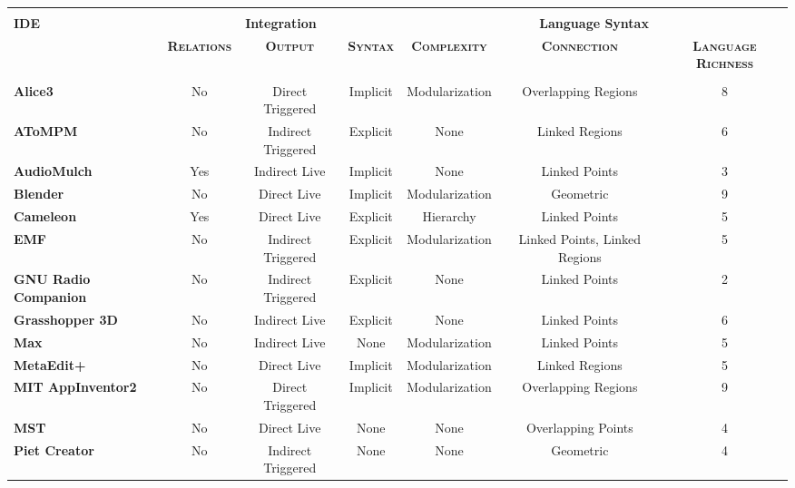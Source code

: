 \begin{table*}
	\centering
		{\scriptsize
		\begin{tabular}{l|ccc|ccc}
		  \hline\hline
		  &&&&&&		\\[-1.5ex]
      \multirow{2}{*}{\textbf{IDE}}
      & \multicolumn{3}{c|}{\textbf{Integration}}
      & \multicolumn{3}{c}{\textbf{Language Syntax}}  \\[1ex]
      & \textbf{\scshape Relations}
      & \textbf{\scshape Output}
      & \textbf{\scshape Syntax}
      & \textbf{\scshape Complexity}
      & \textbf{\scshape Connection}
      & \textbf{\scshape Language Richness}			\\[1ex]
		  \hline
		  &&&&&&		\\[-1.5ex]
      \textbf{Alice3}    & No	& Direct Triggered	& Implicit	& Modularization	& Overlapping Regions	& 8			\\[1ex]
      \textbf{AToMPM}    & No	& Indirect Triggered	& Explicit	& None	& Linked Regions	& 6			\\[1ex]
      \textbf{AudioMulch}    & Yes	& Indirect Live	& Implicit	& None	& Linked Points	& 3			\\[1ex]
      \textbf{Blender}    & No	& Direct Live	& Implicit	& Modularization	& Geometric	& 9			\\[1ex]
      \textbf{Cameleon}    & Yes	& Direct Live	& Explicit	& Hierarchy	& Linked Points	& 5			\\[1ex]
      \textbf{EMF}    & No	& Indirect Triggered	& Explicit	& Modularization	& Linked Points, Linked Regions	& 5			\\[1ex]
      \textbf{GNU Radio Companion}    & No	& Indirect Triggered	& Explicit	& None	& Linked Points	& 2			\\[1ex]
      \textbf{Grasshopper 3D}    & No	& Indirect Live	& Explicit	& None	& Linked Points	& 6			\\[1ex]
      \textbf{Max}    & No	& Indirect Live	& None	& Modularization	& Linked Points	& 5			\\[1ex]
      \textbf{MetaEdit+}    & No	& Direct Live	& Implicit	& Modularization	& Linked Regions	& 5			\\[1ex]
      \textbf{MIT AppInventor2}    & No	& Direct Triggered	& Implicit	& Modularization	& Overlapping Regions	& 9			\\[1ex]
      \textbf{MST}    & No	& Direct Live	& None	& None	& Overlapping Points	& 4			\\[1ex]
      \textbf{Piet Creator}    & No	& Indirect Triggered	& None	& None	& Geometric	& 4			\\[1ex]

\end{tabular}}
\end{table*}
